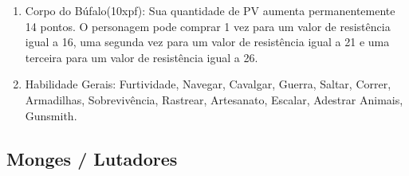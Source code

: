 \begin{enumerate}
    \item Corpo do Búfalo(10xpf): Sua quantidade de PV aumenta permanentemente 14 pontos. O personagem pode comprar 1 vez para um valor de resistência igual a 16, uma segunda vez para um valor de resistência igual a 21 e uma terceira para um valor de resistência igual a 26.

		
\item Habilidade Gerais: Furtividade, Navegar, Cavalgar, Guerra, Saltar, Correr, Armadilhas, Sobrevivência, Rastrear, Artesanato, Escalar, Adestrar Animais, Gunsmith.
\end{enumerate}
 

\subsection{Monges / Lutadores} 
    
